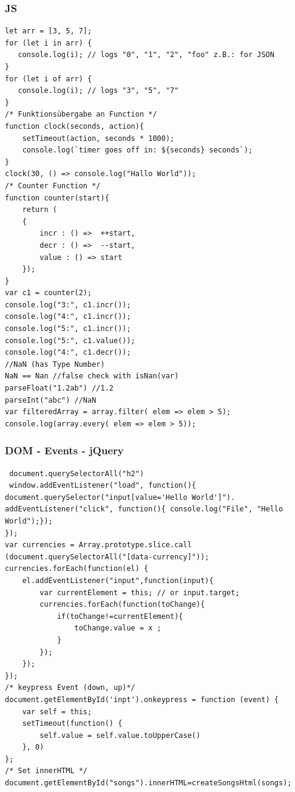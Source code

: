 \begin{multicols*}{4}
\subsubsection{JS}
 \begin{verbatim}
let arr = [3, 5, 7];
for (let i in arr) {
   console.log(i); // logs "0", "1", "2", "foo" z.B.: for JSON
}
for (let i of arr) {
   console.log(i); // logs "3", "5", "7"
}
/* Funktionsübergabe an Function */
function clock(seconds, action){
    setTimeout(action, seconds * 1000);
    console.log(`timer goes off in: ${seconds} seconds`);
}
clock(30, () => console.log("Hallo World"));
/* Counter Function */
function counter(start){
    return (
    {
        incr : () =>  ++start,
        decr : () =>  --start,
        value : () => start
    });
}
var c1 = counter(2);
console.log("3:", c1.incr());
console.log("4:", c1.incr());
console.log("5:", c1.incr());
console.log("5:", c1.value());
console.log("4:", c1.decr());
//NaN (has Type Number)
NaN == Nan //false check with isNan(var)
parseFloat("1.2ab") //1.2
parseInt("abc") //NaN
var filteredArray = array.filter( elem => elem > 5); 
console.log(array.every( elem => elem > 5));
 \end{verbatim}

\subsubsection{DOM - Events - jQuery}
 \begin{verbatim}
 document.querySelectorAll("h2")
 window.addEventListener("load", function(){
document.querySelector("input[value='Hello World']").
addEventListener("click", function(){ console.log("File", "Hello World");});
});
var currencies = Array.prototype.slice.call
(document.querySelectorAll("[data-currency]"));
currencies.forEach(function(el) {
    el.addEventListener("input",function(input){
        var currentElement = this; // or input.target;
        currencies.forEach(function(toChange){
            if(toChange!=currentElement){
                toChange.value = x ;
            }
        });
    });
}); 
/* keypress Event (down, up)*/
document.getElementById('inpt').onkeypress = function (event) {
    var self = this;
    setTimeout(function() {
        self.value = self.value.toUpperCase()
    }, 0)
};
/* Set innerHTML */
document.getElementById("songs").innerHTML=createSongsHtml(songs);
\end{verbatim}


\end{multicols*}
